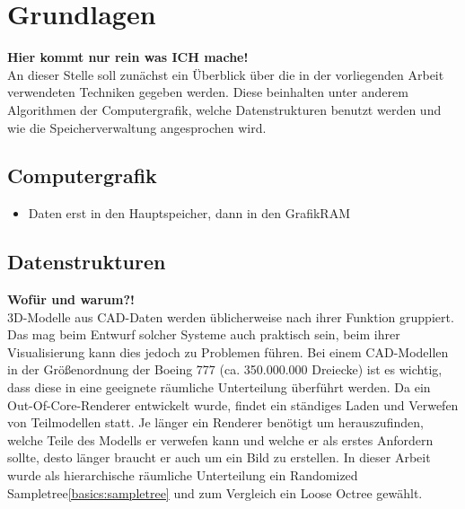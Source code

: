 \chapter{Grundlagen}
\label{basics}

\textbf{Hier kommt nur rein was ICH mache!}\\
An dieser Stelle soll zunächst ein Überblick über die in der vorliegenden Arbeit verwendeten Techniken gegeben werden. Diese beinhalten unter anderem Algorithmen der Computergrafik, welche Datenstrukturen benutzt werden und wie die Speicherverwaltung angesprochen wird.

\section{Computergrafik}
\label{basics:computergrafik}
\begin{itemize}
 \item Daten erst in den Hauptspeicher, dann in den GrafikRAM
\end{itemize}

\section{Datenstrukturen}
\label{basics:datenstrukturen}
\textbf{Wofür und warum?!}\\
3D-Modelle aus CAD-Daten werden üblicherweise nach ihrer Funktion gruppiert. Das mag beim Entwurf solcher Systeme auch praktisch sein, beim ihrer Visualisierung kann dies jedoch zu Problemen führen. Bei einem CAD-Modellen in der Größenordnung der Boeing 777 (ca. 350.000.000 Dreiecke) ist es wichtig, dass diese in eine geeignete räumliche Unterteilung überführt werden. Da ein Out-Of-Core-Renderer entwickelt wurde, findet ein ständiges Laden und Verwefen von Teilmodellen statt. Je länger ein Renderer benötigt um herauszufinden, welche Teile des Modells er verwefen kann und welche er als erstes Anfordern sollte, desto länger braucht er auch um ein Bild zu erstellen. In dieser Arbeit wurde als hierarchische räumliche Unterteilung ein Randomized Sampletree\ref{basics:sampletree} und zum Vergleich ein Loose Octree gewählt.

